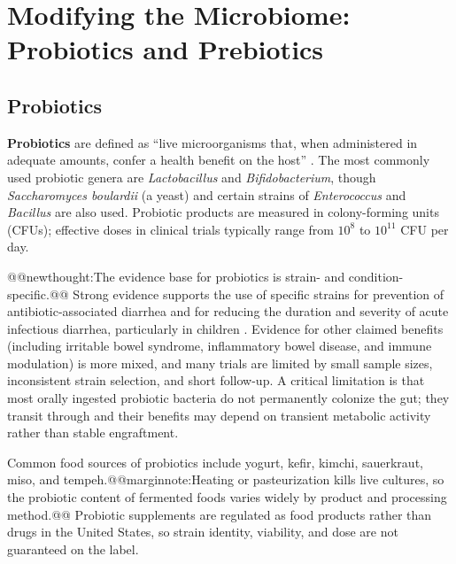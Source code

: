 \documentclass{tufte-handout}
\makeatletter
\def\newthought#1{@@newthought:#1@@}
\def\marginnote#1{@@marginnote:#1@@}
\makeatother
\begin{document}
\section{Modifying the Microbiome: Probiotics and Prebiotics}

\subsection{Probiotics}

\textbf{Probiotics} are defined as ``live microorganisms that, when administered in adequate amounts, confer a health benefit on the host'' \citep{hillExpertConsensusDocument2014}. The most commonly used probiotic genera are \textit{Lactobacillus} and \textit{Bifidobacterium}, though \textit{Saccharomyces boulardii} (a yeast) and certain strains of \textit{Enterococcus} and \textit{Bacillus} are also used. Probiotic products are measured in colony-forming units (CFUs); effective doses in clinical trials typically range from $10^8$ to $10^{11}$ CFU per day.

\newthought{The evidence base for probiotics is strain- and condition-specific.} Strong evidence supports the use of specific strains for prevention of antibiotic-associated diarrhea and for reducing the duration and severity of acute infectious diarrhea, particularly in children \citep{hillExpertConsensusDocument2014}. Evidence for other claimed benefits (including irritable bowel syndrome, inflammatory bowel disease, and immune modulation) is more mixed, and many trials are limited by small sample sizes, inconsistent strain selection, and short follow-up. A critical limitation is that most orally ingested probiotic bacteria do not permanently colonize the gut; they transit through and their benefits may depend on transient metabolic activity rather than stable engraftment.

Common food sources of probiotics include yogurt, kefir, kimchi, sauerkraut, miso, and tempeh.\marginnote{Heating or pasteurization kills live cultures, so the probiotic content of fermented foods varies widely by product and processing method.} Probiotic supplements are regulated as food products rather than drugs in the United States, so strain identity, viability, and dose are not guaranteed on the label.
\end{document}
